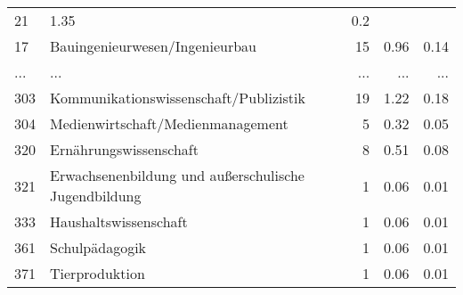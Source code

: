 \begin{longtable}{lXrrr}
          \num{21} &
          \num[round-mode=places,round-precision=2]{1,35} &
          \num[round-mode=places,round-precision=2]{0,2} \\
        17 & \multicolumn{1}{X}{Bauingenieurwesen/Ingenieurbau} & %
          \num{15} &
          \num[round-mode=places,round-precision=2]{0,96} &
          \num[round-mode=places,round-precision=2]{0,14} \\
       ... & ... & ... & ... & ... \\
        303 & \multicolumn{1}{X}{Kommunikationswissenschaft/Publizistik} & %
          \num{19} &
          \num[round-mode=places,round-precision=2]{1,22} &
          \num[round-mode=places,round-precision=2]{0,18} \\

        304 & \multicolumn{1}{X}{Medienwirtschaft/Medienmanagement} & %
          \num{5} &
          \num[round-mode=places,round-precision=2]{0,32} &
          \num[round-mode=places,round-precision=2]{0,05} \\

        320 & \multicolumn{1}{X}{Ernährungswissenschaft} & %
          \num{8} &
          \num[round-mode=places,round-precision=2]{0,51} &
          \num[round-mode=places,round-precision=2]{0,08} \\

        321 & \multicolumn{1}{X}{Erwachsenenbildung und außerschulische Jugendbildung} & %
          \num{1} &
          \num[round-mode=places,round-precision=2]{0,06} &
          \num[round-mode=places,round-precision=2]{0,01} \\

        333 & \multicolumn{1}{X}{Haushaltswissenschaft} & %
          \num{1} &
          \num[round-mode=places,round-precision=2]{0,06} &
          \num[round-mode=places,round-precision=2]{0,01} \\

        361 & \multicolumn{1}{X}{Schulpädagogik} & %
          \num{1} &
          \num[round-mode=places,round-precision=2]{0,06} &
          \num[round-mode=places,round-precision=2]{0,01} \\

        371 & \multicolumn{1}{X}{Tierproduktion} & %
          \num{1} &
          \num[round-mode=places,round-precision=2]{0,06} &
          \num[round-mode=places,round-precision=2]{0,01} \\


\end{longtable}
